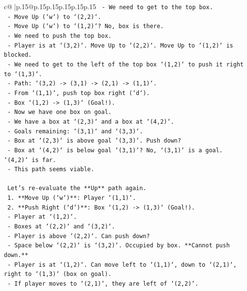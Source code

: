 \documentclass{article}
\begin{document}
{\begin{supertabular}{c@{$\;$}|p{.15\linewidth}@{}p{.15\linewidth}p{.15\linewidth}p{.15\linewidth}p{.15\linewidth}p{.15\linewidth}}
{{{\texttt{       {-} We need to get to the top box.} \\
\texttt{       {-} Move Up (`w`) to `(2,2)`.} \\
\texttt{       {-} Move Up (`w`) to `(1,2)`? No, box is there.} \\
\texttt{       {-} We need to push the top box.} \\
\texttt{       {-} Player is at `(3,2)`. Move Up to `(2,2)`. Move Up to `(1,2)` is blocked.} \\
\texttt{       {-} We need to get to the left of the top box `(1,2)` to push it right to `(1,3)`.} \\
\texttt{       {-} Path: `(3,2) {-}> (3,1) {-}> (2,1) {-}> (1,1)`.} \\
\texttt{       {-} From `(1,1)`, push top box right (`d`).} \\
\texttt{       {-} Box `(1,2) {-}> (1,3)` (Goal!).} \\
\texttt{       {-} Now we have one box on goal.} \\
\texttt{       {-} We have a box at `(2,3)` and a box at `(4,2)`.} \\
\texttt{       {-} Goals remaining: `(3,1)` and `(3,3)`.} \\
\texttt{       {-} Box at `(2,3)` is above goal `(3,3)`. Push down?} \\
\texttt{       {-} Box at `(4,2)` is below goal `(3,1)`? No, `(3,1)` is a goal. `(4,2)` is far.} \\
\texttt{       {-} This path seems viable.} \\
\\ 
\texttt{    Let's re{-}evaluate the **Up** path again.} \\
\texttt{    1. **Move Up (`w`)**: Player `(1,1)`.} \\
\texttt{    2. **Push Right (`d`)**: Box `(1,2) {-}> (1,3)` (Goal!).} \\
\texttt{       {-} Player at `(1,2)`.} \\
\texttt{       {-} Boxes at `(2,2)` and `(3,2)`.} \\
\texttt{       {-} Player is above `(2,2)`. Can push down?} \\
\texttt{       {-} Space below `(2,2)` is `(3,2)`. Occupied by box. **Cannot push down.**} \\
\texttt{       {-} Player is at `(1,2)`. Can move left to `(1,1)`, down to `(2,1)`, right to `(1,3)` (box on goal).} \\
\texttt{       {-} If player moves to `(2,1)`, they are left of `(2,2)`.} \\
}}}
\end{supertabular}}
\end{document}
